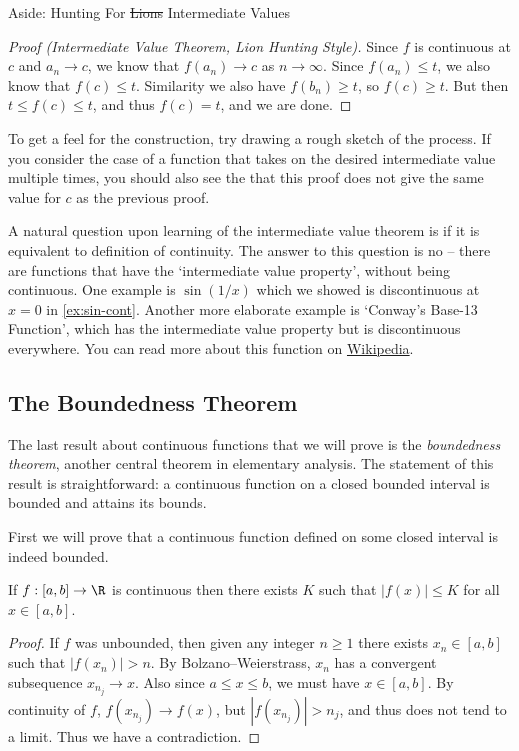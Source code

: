 \begin{aside}{Aside: Hunting For \st{Lions} Intermediate Values}
\begin{proof}[Proof (Intermediate Value Theorem, Lion Hunting Style)]
Since $f$ is continuous at $c$ and $a_n \rightarrow c$, we know that $f(a_n) \rightarrow c$ as $n \rightarrow \infty$. Since $f(a_n) \leq t$, we also know that $f(c) \leq t$. Similarity we also have $f(b_n) \geq t$, so $f(c) \geq t$. But then $t \leq f(c) \leq t$, and thus $f(c) = t$, and we are done.
	\end{proof}

	To get a feel for the construction, try drawing a rough sketch of the process. If you consider the case of a function that takes on the desired intermediate value multiple times, you should also see the that this proof does not give the same value for $c$ as the previous proof.

\end{aside}


A natural question upon learning of the intermediate value theorem is if it is equivalent to definition of continuity. The answer to this question is no -- there are functions that have the `intermediate value property', without being continuous. One example is $\sin(1/x)$ which we showed is discontinuous at $x = 0$ in \autoref{ex:sin-cont}. Another more elaborate example is `Conway's Base-13 Function', which has the intermediate value property but is discontinuous everywhere. You can read more about this function on \href{https://en.wikipedia.org/wiki/Conway_base_13_function}{Wikipedia}.


\subsection{The Boundedness Theorem}

The last result about continuous functions that we will prove is the \emph{boundedness theorem}, another central theorem in elementary analysis. The statement of this result is straightforward: a continuous function on a closed bounded interval is bounded and attains its bounds.

First we will prove that a continuous function defined on some closed interval is indeed bounded.
\begin{lemma}
	If $f:[a, b] \rightarrow \R$ is continuous then there exists $K$ such that $|f(x)| \leq K$ for all $x \in [a, b]$.
\end{lemma}
\begin{proof}
If $f$ was unbounded, then given any integer $n \geq 1$ there exists $x_n \in [a, b]$ such that $|f(x_n)| > n$. By Bolzano–Weierstrass, $x_n$ has a convergent subsequence $x_{n_j} \rightarrow x$. Also since $a \leq x \leq b$, we must have $x \in [a, b]$.
By continuity of $f$, $f(x_{n_j}) \rightarrow f(x)$, but $|f(x_{n_j})| > n_j$, and thus does not tend to a limit. Thus we have a contradiction.
\end{proof}

